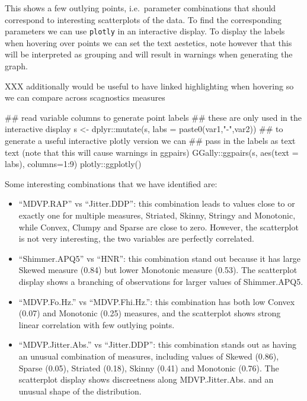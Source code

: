 This shows a few outlying points, i.e.~parameter combinations that
should correspond to interesting scatterplots of the data. To find the
corresponding parameters we can use \texttt{plotly} in an interactive
display. To display the labels when hovering over points we can set the
text aestetics, note however that this will be interpreted as grouping
and will result in warnings when generating the graph.

XXX additionally would be useful to have linked highlighting when
hovering so we can compare across scagnostics measures

\begin{Schunk}
\begin{Sinput}
## read variable columns to generate point labels
## these are only used in the interactive display
s <-  dplyr::mutate(s, labs = paste0(var1,"-",var2))
## to generate a useful interactive plotly version we can
## pass in the labels as text text (note that this will cause warnings in ggpairs)
GGally::ggpairs(s, aes(text = labs), columns=1:9) %>%
  plotly::ggplotly()
\end{Sinput}
\end{Schunk}

Some interesting combinations that we have identified are:

\begin{itemize}
\tightlist
\item
  ``MDVP.RAP'' vs ``Jitter.DDP'': this combination leads to values close
  to or exactly one for multiple measures, Striated, Skinny, Stringy and
  Monotonic, while Convex, Clumpy and Sparse are close to zero. However,
  the scatterplot is not very interesting, the two variables are
  perfectly correlated.
\item
  ``Shimmer.APQ5'' vs ``HNR'': this combination stand out because it has
  large Skewed measure (0.84) but lower Monotonic measure (0.53). The
  scatterplot display shows a branching of observations for larger
  values of Shimmer.APQ5.
\item
  ``MDVP.Fo.Hz.'' vs ``MDVP.Fhi.Hz.'': this combination has both low
  Convex (0.07) and Monotonic (0.25) measures, and the scatterplot shows
  strong linear correlation with few outlying points.
\item
  ``MDVP.Jitter.Abs.'' vs ``Jitter.DDP'': this combination stands out as
  having an unusual combination of measures, including values of Skewed
  (0.86), Sparse (0.05), Striated (0.18), Skinny (0.41) and Monotonic
  (0.76). The scatterplot display shows discreetness along
  MDVP.Jitter.Abs. and an unusual shape of the distribution.
\end{itemize}

